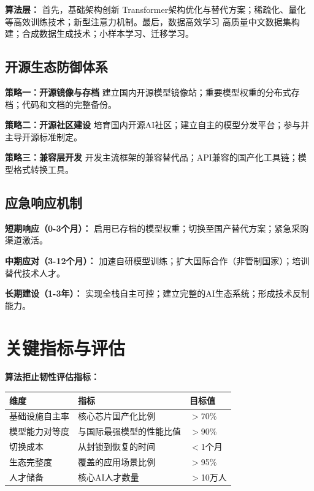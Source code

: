 \textbf{算法层：}
首先，基础架构创新 Transformer架构优化与替代方案；稀疏化、量化等高效训练技术；新型注意力机制。最后，数据高效学习 高质量中文数据集构建；合成数据生成技术；小样本学习、迁移学习。

\subsection{开源生态防御体系}

\textbf{策略一：开源镜像与存档}
建立国内开源模型镜像站；重要模型权重的分布式存档；代码和文档的完整备份。

\textbf{策略二：开源社区建设}
培育国内开源AI社区；建立自主的模型分发平台；参与并主导开源标准制定。

\textbf{策略三：兼容层开发}
开发主流框架的兼容替代品；API兼容的国产化工具链；模型格式转换工具。

\subsection{应急响应机制}

\textbf{短期响应（0-3个月）：}
启用已存档的模型权重；切换至国产替代方案；紧急采购渠道激活。

\textbf{中期应对（3-12个月）：}
加速自研模型训练；扩大国际合作（非管制国家）；培训替代技术人才。

\textbf{长期建设（1-3年）：}
实现全栈自主可控；建立完整的AI生态系统；形成技术反制能力。

\section{关键指标与评估}

\textbf{算法拒止韧性评估指标：}
\begin{table}[htbp]
  \centering
  \begin{tabular}{|p{4cm}|p{5cm}|p{3cm}|}
    \hline
    \textbf{维度} & \textbf{指标} & \textbf{目标值} \\
    \hline
    基础设施自主率 & 核心芯片国产化比例 & $>$70\% \\
    \hline
    模型能力对等度 & 与国际最强模型的性能比值 & $>$90\% \\
    \hline
    切换成本 & 从封锁到恢复的时间 & $<$1个月 \\
    \hline
    生态完整度 & 覆盖的应用场景比例 & $>$95\% \\
    \hline
    人才储备 & 核心AI人才数量 & $>$10万人 \\
    \hline
  \end{tabular}
\end{table}

